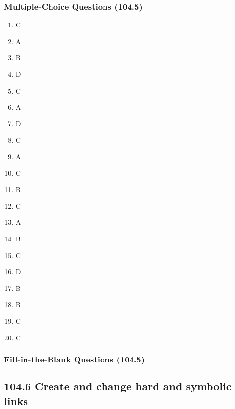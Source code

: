 \documentclass[a4paper]{report}
\begin{document}
\subsubsection*{Multiple-Choice Questions (104.5)}
\begin{enumerate}[1.]
    \item C
    \item A
    \item B
    \item D
    \item C
    \item A
    \item D
    \item C
    \item A
    \item C
    \item B
    \item C
    \item A
    \item B
    \item C
    \item D
    \item B
    \item B
    \item C
    \item C
\end{enumerate}

\subsubsection*{Fill-in-the-Blank Questions (104.5)}

\subsection*{104.6 Create and change hard and symbolic links}
\end{document}
